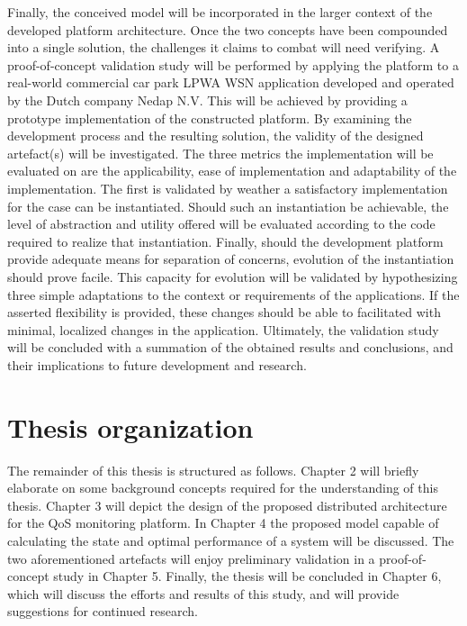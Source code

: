 Finally, the conceived model will be incorporated in the larger context of the developed platform architecture. Once the two concepts have been compounded into a single solution, the challenges it claims to combat will need verifying. A proof-of-concept validation study will be performed by applying the platform to a real-world commercial car park LPWA WSN application developed and operated by the Dutch company Nedap N.V. This will be achieved by providing a prototype implementation of the constructed platform. By examining the development process and the resulting solution, the validity of the designed artefact(s) will be investigated. The three metrics the implementation will be evaluated on are the applicability, ease of implementation and adaptability of the implementation. The first is validated by weather a satisfactory implementation for the case can be instantiated. Should such an instantiation be achievable, the level of abstraction and utility offered will be evaluated according to the code required to realize that instantiation. Finally, should the development platform provide adequate means for separation of concerns, evolution of the instantiation should prove facile. This capacity for evolution will be validated by hypothesizing three simple adaptations to the context or requirements of the applications. If the asserted flexibility is provided, these changes should be able to facilitated with minimal, localized changes in the application. Ultimately, the validation study will be concluded with a summation of the obtained results and conclusions, and their implications to future development and research.

\section{Thesis organization}
The remainder of this thesis is structured as follows. Chapter 2 will briefly elaborate on some background concepts required for the understanding of this thesis. Chapter 3 will depict the design of the proposed distributed architecture for the QoS monitoring platform. In Chapter 4 the proposed model capable of calculating the state and optimal performance of a system will be discussed. The two aforementioned artefacts will enjoy preliminary validation in a proof-of-concept study in Chapter 5. Finally, the thesis will be concluded in Chapter 6, which will discuss the efforts and results of this study, and will provide suggestions for continued research.
